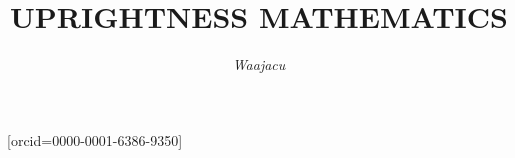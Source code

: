 \documentclass[a4paper,fleqn]{cas-sc}
\begin{document}
\let\WriteBookmarks\relax
\def\floatpagepagefraction{1}
\def\textpagefraction{.001}

\title[mode = title]{UPRIGHTNESS MATHEMATICS}




  \author[1]{\textit{Waajacu}}[orcid=0000-0001-6386-9350]
  \cormark[1] 


  \address[1]{Santiago Restrepo Ruiz, Colombia.}




\end{document}
